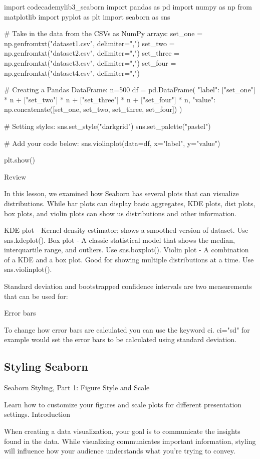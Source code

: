 \documentclass{journal}
\begin{document}
import codecademylib3_seaborn
import pandas as pd
import numpy as np
from matplotlib import pyplot as plt
import seaborn as sns

# Take in the data from the CSVs as NumPy arrays:
set_one = np.genfromtxt("dataset1.csv", delimiter=",")
set_two = np.genfromtxt("dataset2.csv", delimiter=",")
set_three = np.genfromtxt("dataset3.csv", delimiter=",")
set_four = np.genfromtxt("dataset4.csv", delimiter=",")

# Creating a Pandas DataFrame:
n=500
df = pd.DataFrame({
    "label": ["set_one"] * n + ["set_two"] * n + ["set_three"] * n + ["set_four"] * n,
    "value": np.concatenate([set_one, set_two, set_three, set_four])
})

# Setting styles:
sns.set_style("darkgrid")
sns.set_palette("pastel")

# Add your code below:
sns.violinplot(data=df, x="label", y="value")

plt.show()


Review

In this lesson, we examined how Seaborn has several plots that can visualize distributions. While bar plots can display basic aggregates, KDE plots, dist plots, box plots, and violin plots can show us distributions and other information.

    KDE plot - Kernel density estimator; shows a smoothed version of dataset. Use sns.kdeplot().
    Box plot - A classic statistical model that shows the median, interquartile range, and outliers. Use sns.boxplot().
    Violin plot - A combination of a KDE and a box plot. Good for showing multiple distributions at a time. Use sns.violinplot().

Standard deviation and bootstrapped confidence intervals are two measurements that can be used for:


Error bars

To change how error bars are calculated you can use the keyword ci. ci="sd" for example would set the error bars to be calculated using standard deviation.


\subsection{Styling Seaborn}
Seaborn Styling, Part 1: Figure Style and Scale

Learn how to customize your figures and scale plots for different presentation settings.
Introduction

When creating a data visualization, your goal is to communicate the insights found in the data. While visualizing communicates important information, styling will influence how your audience understands what you’re trying to convey.
\end{document}

